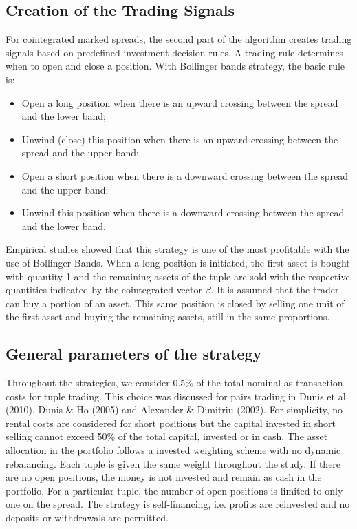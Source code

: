 \documentclass[11pt,a4,twosided,singlespacing,titlepagenumber=on]{scrreprt}
\numberwithin{equation}{chapter} %
\theoremstyle{remark}
\begin{document}
\subsection{Creation of the Trading Signals}
For cointegrated marked spreads, the second part of the algorithm creates trading signals based on predefined investment decision rules. A trading rule determines when to open and close a position. With Bollinger bands strategy, the basic rule is:

\begin{itemize}
\item Open a long position when there is an upward crossing between the spread and the lower band;
\item Unwind (close) this position when there is an upward crossing between the spread and the upper band;
\item Open a short position when there is a downward crossing between the spread and the upper band;
\item Unwind this position when there is a downward crossing between the spread and the lower band.
\end{itemize}
Empirical studies showed that this strategy is one of the most profitable with the use of Bollinger Bands. When a long position is initiated, the first asset is bought with quantity 1 and the remaining assets of the tuple are sold with the respective quantities indicated by the cointegrated vector $\beta$. It is assumed that the trader can buy a portion of an asset. This same position is closed by selling one unit of the first asset and buying the remaining assets, still in the same proportions.

\subsection{General parameters of the strategy}
Throughout the strategies, we consider 0.5\% of the total nominal as transaction costs for tuple trading. This choice was discussed for pairs trading in Dunis et al. (2010), Dunis \& Ho (2005) and Alexander \& Dimitriu (2002). For simplicity, no rental costs are considered for short positions but the capital invested in short selling cannot exceed 50\% of the total capital, invested or in cash. The asset allocation in the portfolio follows a invested weighting scheme with no dynamic rebalancing. Each tuple is given the same weight throughout the study. If there are no open positions, the money is not invested and remain as cash in the portfolio. For a particular tuple, the number of open positions is limited to only one on the spread. The strategy is self-financing, i.e. profits are reinvested and no deposits or withdrawals are permitted.
\end{document}
